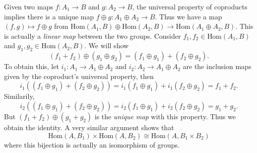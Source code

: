 Given two maps $f: A_1 \to B$ and $g: A_2 \to B$, the universal property of coproducts implies there is a unique map $f \oplus g: A_1 \oplus A_2 \to B$. Thus we have a map $(f,g) \mapsto f \oplus g$ from $\text{Hom}(A_1,B) \oplus \text{Hom}(A_2,B) \to \text{Hom}(A_1 \oplus A_2,B)$. This is actually a \emph{linear map} between the two groups. Consider $f_1,f_2 \in \text{Hom}(A_1,B)$ and $g_1,g_2 \in \text{Hom}(A_2,B)$. We will show
%
\[ (f_1 + f_2) \oplus (g_1 \oplus g_2) = (f_1 \oplus g_1) + (f_2 \oplus g_2). \]
%
To obtain this, let $i_1: A_1 \to A_1 \oplus A_2$ and $i_2: A_2 \to A_1 \oplus A_2$ are the inclusion maps given by the coproduct's universal property, then
%
\[ i_1((f_1 \oplus g_1) + (f_2 \oplus g_2)) = i_1(f_1 \oplus g_1) + i_1(f_2 \oplus g_2) = f_1 + f_2. \]
%
Similarily,
%
\[ i_2((f_1 \oplus g_1) + (f_2 \oplus g_2)) = i_2(f_1 \oplus g_1) + i_2(f_2 \oplus g_2) = g_1 + g_2. \]
%
But $(f_1 + f_2) \oplus (g_1 + g_2)$ is the \emph{unique map} with this property. Thus we obtain the identity. A very similar argument shows that
%
\[ \text{Hom}(A,B_1) \times \text{Hom}(A,B_2) \cong \text{Hom}(A,B_1 \times B_2) \]
%
where this bijection is actually an isomorphism of groups.

